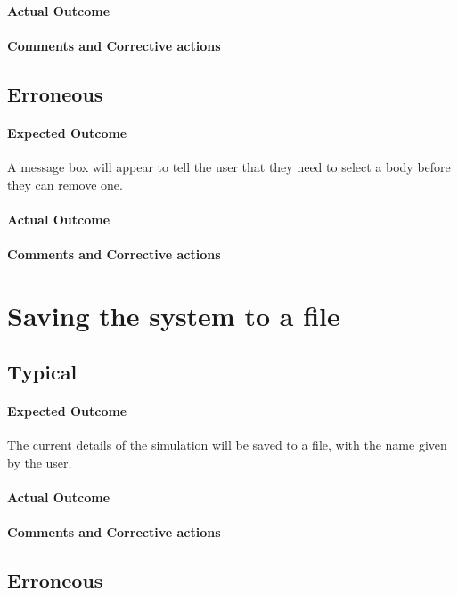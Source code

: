 \paragraph{Actual Outcome}
\paragraph{Comments and Corrective actions}

\subsection{Erroneous}
\paragraph{Expected Outcome}
A message box will appear to tell the user that they need to select a body
before they can remove one.
\paragraph{Actual Outcome}
\paragraph{Comments and Corrective actions}


\section{Saving the system to a file}
\subsection{Typical}
\paragraph{Expected Outcome}
The current details of the simulation will be saved to a file, with the name
given by the user.
\paragraph{Actual Outcome}
\paragraph{Comments and Corrective actions}

\subsection{Erroneous}
